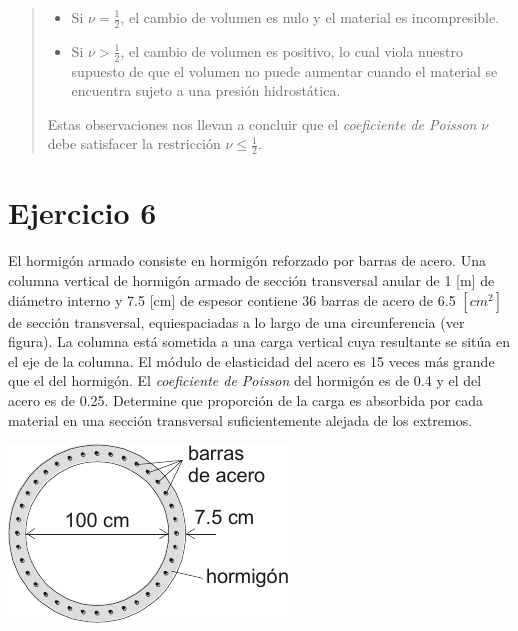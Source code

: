 \documentclass[a4paper,10pt,twoside,final,spanish]{article}
\begin{document}
\begin{quote}
\begin{itemize}
\item Si $\nu=\frac{1}{2}$, el cambio de volumen es nulo y el material es incompresible.

\item Si $\nu>\frac{1}{2}$, el cambio de volumen es positivo, lo cual viola nuestro supuesto de que el volumen no puede aumentar cuando el material se encuentra sujeto a una presión hidrostática.
\end{itemize}

Estas observaciones nos llevan a concluir que el \textit{coeficiente de Poisson} $\nu$ debe satisfacer la restricción $\nu\leq\frac{1}{2}$.

\end{quote}

\section*{Ejercicio 6}

El hormigón armado consiste en hormigón reforzado por barras de acero. Una columna 
vertical de hormigón armado de sección transversal anular de 1 [m] de diámetro interno y 7.5 [cm] de espesor contiene 36 barras de acero de 6.5 $[cm^2]$ de sección transversal, equiespaciadas a lo largo de una circunferencia (ver figura). La columna está sometida a una carga vertical cuya resultante se sitúa en el eje de la columna.  El módulo de elasticidad del acero es 15 veces más grande que el del hormigón. El \textit{coeficiente de Poisson} del hormigón es de 0.4 y el del acero es de 0.25. Determine que proporción de la carga es absorbida por cada material en una sección  transversal suficientemente alejada de los extremos.

\begin{center}
\includegraphics{ej6.pdf}
\end{center}

\dotfill
\end{document}
